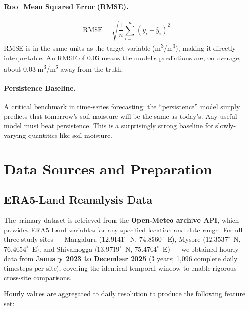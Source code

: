 \documentclass[12pt, a4paper]{article}
\begin{document}
\paragraph{Root Mean Squared Error (RMSE).}
\[
\text{RMSE} = \sqrt{\frac{1}{n}\sum_{i=1}^{n}(y_i - \hat{y}_i)^2}
\]
RMSE is in the same units as the target variable (m\textsuperscript{3}/m\textsuperscript{3}), making it directly interpretable. An RMSE of 0.03 means the model's predictions are, on average, about 0.03 m\textsuperscript{3}/m\textsuperscript{3} away from the truth.

\paragraph{Persistence Baseline.} A critical benchmark in time-series forecasting: the ``persistence'' model simply predicts that tomorrow's soil moisture will be the same as today's. Any useful model must beat persistence. This is a surprisingly strong baseline for slowly-varying quantities like soil moisture.


\section{Data Sources and Preparation}

\subsection{ERA5-Land Reanalysis Data}

The primary dataset is retrieved from the \textbf{Open-Meteo archive API}, which provides ERA5-Land variables for any specified location and date range. For all three study sites --- Mangaluru ($12.9141^\circ$~N, $74.8560^\circ$~E), Mysore ($12.3537^\circ$~N, $76.4054^\circ$~E), and Shivamogga ($13.9719^\circ$~N, $75.4704^\circ$~E) --- we obtained hourly data from \textbf{January 2023 to December 2025} (3 years; 1,096 complete daily timesteps per site), covering the identical temporal window to enable rigorous cross-site comparisons.

Hourly values are aggregated to daily resolution to produce the following feature set:
\end{document}
